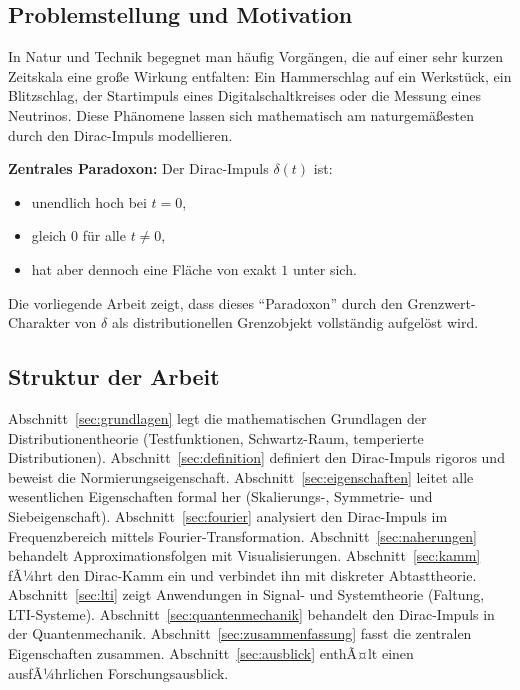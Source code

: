﻿\documentclass[a4paper,12pt]{article}
\theoremstyle{definition}
\begin{document}
\subsection{Problemstellung und Motivation}

In Natur und Technik begegnet man h\"aufig Vorg\"angen, die auf einer sehr kurzen Zeitskala
eine gro{\ss}e Wirkung entfalten: Ein Hammerschlag auf ein Werkst\"uck, ein Blitzschlag, der
Startimpuls eines Digitalschaltkreises oder die Messung eines Neutrinos. Diese Ph\"anomene
lassen sich mathematisch am naturgem\"a{\ss}esten durch den Dirac-Impuls modellieren.

\textbf{Zentrales Paradoxon:} Der Dirac-Impuls $\delta(t)$ ist:
\begin{itemize}
    \item unendlich hoch bei $t = 0$,
    \item gleich $0$ f\"ur alle $t \neq 0$,
    \item hat aber dennoch eine Fl\"ache von exakt $1$ unter sich.
\end{itemize}
Die vorliegende Arbeit zeigt, dass dieses ``Paradoxon'' durch den Grenzwert-Charakter von
$\delta$ als distributionellen Grenzobjekt vollst\"andig aufgel\"ost wird.

\subsection{Struktur der Arbeit}

Abschnitt~\ref{sec:grundlagen} legt die mathematischen Grundlagen der Distributionentheorie (Testfunktionen, Schwartz-Raum, temperierte Distributionen). Abschnitt~\ref{sec:definition} definiert den Dirac-Impuls rigoros und beweist die Normierungseigenschaft. Abschnitt~\ref{sec:eigenschaften} leitet alle wesentlichen Eigenschaften formal her (Skalierungs-, Symmetrie- und Siebeigenschaft). Abschnitt~\ref{sec:fourier} analysiert den Dirac-Impuls im Frequenzbereich mittels Fourier-Transformation. Abschnitt~\ref{sec:naherungen} behandelt Approximationsfolgen mit Visualisierungen. Abschnitt~\ref{sec:kamm} fÃ¼hrt den Dirac-Kamm ein und verbindet ihn mit diskreter Abtasttheorie. Abschnitt~\ref{sec:lti} zeigt Anwendungen in Signal- und Systemtheorie (Faltung, LTI-Systeme). Abschnitt~\ref{sec:quantenmechanik} behandelt den Dirac-Impuls in der Quantenmechanik. Abschnitt~\ref{sec:zusammenfassung} fasst die zentralen Eigenschaften zusammen. Abschnitt~\ref{sec:ausblick} enthÃ¤lt einen ausfÃ¼hrlichen Forschungsausblick.

\end{document}
